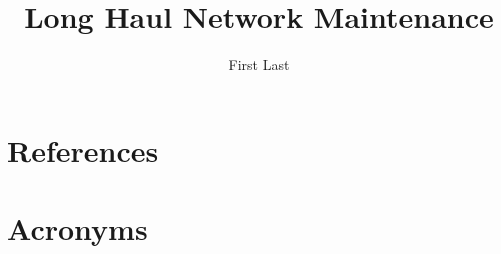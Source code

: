 \documentclass[PMO,lsstdraft,authoryear,toc]{lsstdoc}
\title{Long Haul Network Maintenance}
\author{%
First Last
}
\date{\vcsDate}
\begin{document}
\maketitle


\appendix
\section{References} \label{sec:bib}
\renewcommand{\refname}{} %


\section{Acronyms} \label{sec:acronyms}

\end{document}
